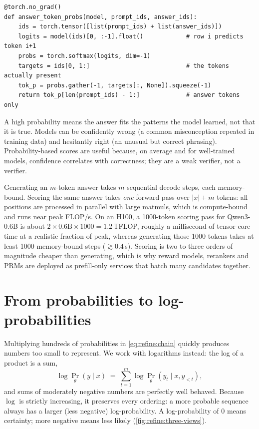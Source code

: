 \begin{lstlisting}[caption={Per-token probabilities of an answer by teacher forcing.},label={lst:refine:tokprob}]
@torch.no_grad()
def answer_token_probs(model, prompt_ids, answer_ids):
    ids = torch.tensor([list(prompt_ids) + list(answer_ids)])
    logits = model(ids)[0, :-1].float()            # row i predicts token i+1
    probs = torch.softmax(logits, dim=-1)
    targets = ids[0, 1:]                           # the tokens actually present
    tok_p = probs.gather(-1, targets[:, None]).squeeze(-1)
    return tok_p[len(prompt_ids) - 1:]             # answer tokens only
\end{lstlisting}

\begin{keyidea}
A high probability means the answer fits the patterns the model learned, not that it is true. Models
can be confidently wrong (a common misconception repeated in training data) and hesitantly right
(an unusual but correct phrasing). Probability-based scores are useful because, on average and for
well-trained models, confidence correlates with correctness; they are a weak verifier, not a
verifier.
\end{keyidea}

\begin{systemslens}
Generating an $m$-token answer takes $m$ sequential decode steps, each memory-bound. Scoring the same
answer takes \emph{one} forward pass over $|x| + m$ tokens: all positions are processed in parallel
with large matmuls, which is compute-bound and runs near peak FLOP/s. On an H100, a 1000-token
scoring pass for Qwen3-0.6B is about $2 \times 0.6\text{B} \times 1000 = 1.2$\,TFLOP, roughly a
millisecond of tensor-core time at a realistic fraction of peak, whereas generating those 1000 tokens
takes at least 1000 memory-bound steps ($\gtrsim 0.4$\,s). Scoring is two to three orders of magnitude
cheaper than generating, which is why reward models, rerankers and PRMs are deployed as prefill-only
services that batch many candidates together.
\end{systemslens}

\section{From probabilities to log-probabilities}\label{sec:refine:logprob}


Multiplying hundreds of probabilities in \cref{eq:refine:chain} quickly produces numbers too small to
represent. We work with logarithms instead: the log of a product is a sum,
\begin{equation}
  \log \Pr_\theta(y \mid x) \;=\; \sum_{t=1}^{m} \log \Pr_\theta(y_t \mid x, y_{<t}),
\end{equation}
and sums of moderately negative numbers are perfectly well behaved. Because $\log$ is strictly
increasing, it preserves every ordering: a more probable sequence always has a larger (less
negative) log-probability. A log-probability of $0$ means certainty; more negative means less likely
(\cref{fig:refine:three-views}).

